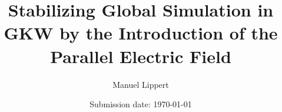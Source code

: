 \titlehead{
    \centering
    \texttt{[image: Uni\_Logo\_white\_black.png]}
}

\subject{\normalfont Master Thesis}
\title{Stabilizing Global Simulation in GKW by the Introduction of the Parallel Electric Field \boldmath{$\Epar$}}
\author{Manuel Lippert}
\date{Submission date: \today}
\publishers{\textbf{Physics Department at the University of Bayreuth}\\
\vspace*{2em}
Supervisors:\\
Prof.\,Arthur\,G.\,Peeters\\
Dr.\,Florian\,Rath
}